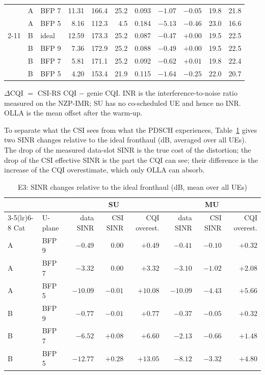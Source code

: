 \documentclass[11pt,a4paper]{article}
\begin{document}
\begin{table}[H]
\begin{tabular}{@{}l l l r r r r r r r r@{}}
                    & A & BFP 7  & 11.31 & 166.4 & 25.2 & 0.093 & $-1.07$ & $-0.05$ & 19.8 & 21.8 \\
                    & A & BFP 5  &  8.16 & 112.3 &  4.5 & 0.184 & $-5.13$ & $-0.46$ & 23.0 & 16.6 \\
\cmidrule(l){2-11}
                    & B & ideal  & 12.59 & 173.3 & 25.2 & 0.087 & $-0.47$ & $+0.00$ & 19.5 & 22.5 \\
                    & B & BFP 9  &  7.36 & 172.9 & 25.2 & 0.088 & $-0.49$ & $+0.00$ & 19.5 & 22.5 \\
                    & B & BFP 7  &  5.81 & 171.1 & 25.2 & 0.092 & $-0.62$ & $+0.01$ & 19.8 & 22.4 \\
                    & B & BFP 5  &  4.20 & 153.4 & 21.9 & 0.115 & $-1.64$ & $-0.25$ & 22.0 & 20.7 \\
\bottomrule
\end{tabular}

\smallskip
\parbox{\textwidth}{\footnotesize $\Delta$CQI $=$ CSI-RS CQI $-$ genie CQI. INR is the interference-to-noise ratio measured on the
NZP-IMR; SU has no co-scheduled UE and hence no INR. OLLA is the mean offset after the warm-up.}
\end{table}

To separate what the CSI sees from what the PDSCH experiences, Table~\ref{tab:e3sinr} gives two SINR changes relative to the
ideal fronthaul (dB, averaged over all UEs). The drop of the measured data-slot SINR is the true cost of the distortion; the drop
of the CSI effective SINR is the part the CQI can see; their difference is the increase of the CQI overestimate, which only OLLA
can absorb.

\begin{table}[H]
\centering
\caption{E3: SINR changes relative to the ideal fronthaul (dB, mean over all UEs)}
\label{tab:e3sinr}
\footnotesize
\begin{tabular}{@{}l l r r r r r r@{}}
\toprule
 & & \multicolumn{3}{c}{SU} & \multicolumn{3}{c}{MU} \\
\cmidrule(lr){3-5}\cmidrule(lr){6-8}
Cat & U-plane & data SINR & CSI SINR & CQI overest. & data SINR & CSI SINR & CQI overest. \\
\midrule
A & BFP 9 & $-0.49$  & $0.00$  & $+0.49$  & $-0.41$  & $-0.10$ & $+0.32$ \\
A & BFP 7 & $-3.32$  & $0.00$  & $+3.32$  & $-3.10$  & $-1.02$ & $+2.08$ \\
A & BFP 5 & $-10.09$ & $-0.01$ & $+10.08$ & $-10.09$ & $-4.43$ & $+5.66$ \\
\midrule
B & BFP 9 & $-0.77$  & $-0.01$ & $+0.77$  & $-0.37$  & $-0.05$ & $+0.32$ \\
B & BFP 7 & $-6.52$  & $+0.08$ & $+6.60$  & $-2.13$  & $-0.66$ & $+1.48$ \\
B & BFP 5 & $-12.77$ & $+0.28$ & $+13.05$ & $-8.12$  & $-3.32$ & $+4.80$ \\
\bottomrule
\end{tabular}
\end{table}
\end{document}
